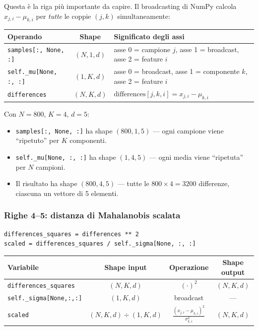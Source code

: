 \documentclass[11pt,a4paper]{article}
\begin{document}
Questa è la riga più importante da capire. Il broadcasting di NumPy
calcola $x_{j,i} - \mu_{k,i}$ per \emph{tutte} le coppie $(j,k)$
simultaneamente:

\begin{center}
\renewcommand{\arraystretch}{1.3}
\begin{tabular}{lcl}
\toprule
\textbf{Operando} & \textbf{Shape} & \textbf{Significato degli assi} \\
\midrule
\texttt{samples[:, None, :]} & $(N, 1, d)$ &
asse 0 = campione $j$, asse 1 = broadcast, asse 2 = feature $i$ \\
\texttt{self.\_mu[None, :, :]} & $(1, K, d)$ &
asse 0 = broadcast, asse 1 = componente $k$, asse 2 = feature $i$ \\
\midrule
\texttt{differences} & $(N, K, d)$ &
$\text{differences}[j,k,i] = x_{j,i} - \mu_{k,i}$ \\
\bottomrule
\end{tabular}
\end{center}

\begin{exbox}
Con $N=800$, $K=4$, $d=5$:
\begin{itemize}[nosep]
  \item \texttt{samples[:, None, :]} ha shape $(800, 1, 5)$ --- ogni
        campione viene ``ripetuto'' per $K$ componenti.
  \item \texttt{self.\_mu[None, :, :]} ha shape $(1, 4, 5)$ --- ogni
        media viene ``ripetuta'' per $N$ campioni.
  \item Il risultato ha shape $(800, 4, 5)$ --- tutte le $800 \times 4
        = 3200$ differenze, ciascuna un vettore di 5 elementi.
\end{itemize}
\end{exbox}

\subsubsection{Righe 4--5: distanza di Mahalanobis scalata}
\begin{lstlisting}
differences_squares = differences ** 2
scaled = differences_squares / self._sigma[None, :, :]
\end{lstlisting}

\begin{center}
\renewcommand{\arraystretch}{1.3}
\begin{tabular}{lccc}
\toprule
\textbf{Variabile} & \textbf{Shape input} & \textbf{Operazione} &
\textbf{Shape output} \\
\midrule
\texttt{differences\_squares} & $(N,K,d)$ & $(\cdot)^2$ & $(N,K,d)$ \\
\texttt{self.\_sigma[None,:,:]} & $(1,K,d)$ & broadcast & --- \\
\texttt{scaled} & $(N,K,d) \div (1,K,d)$ &
$\frac{(x_{j,i}-\mu_{k,i})^2}{\sigma_{k,i}^2}$ & $(N,K,d)$ \\
\bottomrule
\end{tabular}
\end{center}
\end{document}
